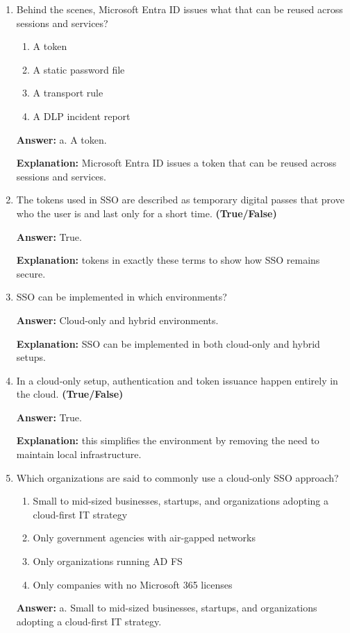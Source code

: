 \documentclass[10pt]{article}
\begin{document}
\begin{enumerate}[leftmargin=*]
\textbf{Explanation:} All of these services are explicitly named in the documentation as examples of SSO access across Microsoft and non-Microsoft apps.

\item Behind the scenes, Microsoft Entra ID issues what that can be reused across sessions and services?
\begin{enumerate}[label=\alph*., leftmargin=1.5em]
\item A token
\item A static password file
\item A transport rule
\item A DLP incident report
\end{enumerate}
\textbf{Answer:} a. A token.

\textbf{Explanation:} Microsoft Entra ID issues a token that can be reused across sessions and services.

\item The tokens used in SSO are described as temporary digital passes that prove who the user is and last only for a short time. \textbf{(True/False)}

\textbf{Answer:} True.

\textbf{Explanation:} tokens in exactly these terms to show how SSO remains secure.

\item SSO can be implemented in which environments?

\textbf{Answer:} Cloud-only and hybrid environments.

\textbf{Explanation:} SSO can be implemented in both cloud-only and hybrid setups.

\item In a cloud-only setup, authentication and token issuance happen entirely in the cloud. \textbf{(True/False)}

\textbf{Answer:} True.

\textbf{Explanation:} this simplifies the environment by removing the need to maintain local infrastructure.

\item Which organizations are said to commonly use a cloud-only SSO approach?
\begin{enumerate}[label=\alph*., leftmargin=1.5em]
\item Small to mid-sized businesses, startups, and organizations adopting a cloud-first IT strategy
\item Only government agencies with air-gapped networks
\item Only organizations running AD FS
\item Only companies with no Microsoft 365 licenses
\end{enumerate}
\textbf{Answer:} a. Small to mid-sized businesses, startups, and organizations adopting a cloud-first IT strategy.


\end{enumerate}
\end{document}

